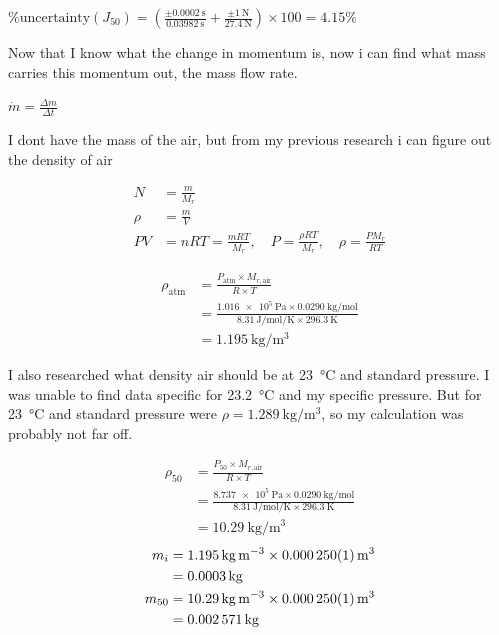 \documentclass[12pt,a4paper]{article}
\begin{document}
$\%\text{uncertainty}(J_{50}) = \left(\frac{\pm \SI{0.0002}{\second}}{\SI{0.03982}{\second}} + \frac{\pm \SI{1}{\newton}}{\SI{27.4}{\newton}}\right) \times 100 = 4.15\%$

Now that I know what the change in momentum is, now i can find what mass carries this momentum out, the mass flow rate.

$\dot{m} = \frac{\Delta m}{\Delta t}$

I dont have the mass of the air, but from my previous research i can figure out the density of air

\begin{align}
N &= \frac{m}{M_r} \\
\rho &= \frac{m}{V} \\
PV &= nRT = \frac{mRT}{M_r}, \quad P = \frac{\rho RT}{M_r}, \quad \rho = \frac{PM_r}{RT}
\end{align}

\begin{align}
\rho_{\text{atm}} &= \frac{P_{\text{atm}} \times M_{r,\text{air}}}{R \times T} \\
&= \frac{\SI{1.016e5}{\pascal} \times \SI{0.0290}{\kilo\gram\per\mol}}{\SI{8.31}{\joule\per\mol\per\kelvin} \times \SI{296.3}{\kelvin}} \\
&= \SI{1.195}{\kilo\gram\per\meter\cubed}
\end{align}

I also researched what density air should be at \SI{23}{\celsius} and standard pressure. I was unable to find data specific for \SI{23.2}{\celsius} and my specific pressure. But for \SI{23}{\celsius} and standard pressure were $\rho = \SI{1.289}{\kilo\gram\per\meter\cubed}$, so my calculation was probably not far off.

\begin{align}
\rho_{50} &= \frac{P_{50} \times M_{r,\text{air}}}{R \times T} \\
&= \frac{\SI{8.737e5}{\pascal} \times \SI{0.0290}{\kilo\gram\per\mol}}{\SI{8.31}{\joule\per\mol\per\kelvin} \times \SI{296.3}{\kelvin}} \\
&= \SI{10.29}{\kilo\gram\per\meter\cubed}
\end{align}
\begin{align}
m_i &= \SI{1.195}{\kilo\gram\per\meter\cubed} \times \SI{0.000250 \pm 0.000001}{\meter\cubed} \\
&= \SI{0.0003}{\kilo\gram} \\
m_{50} &= \SI{10.29}{\kilo\gram\per\meter\cubed} \times \SI{0.000250 \pm 0.000001}{\meter\cubed} \\
&= \SI{0.002571}{\kilo\gram}
\end{align}
\end{document}

